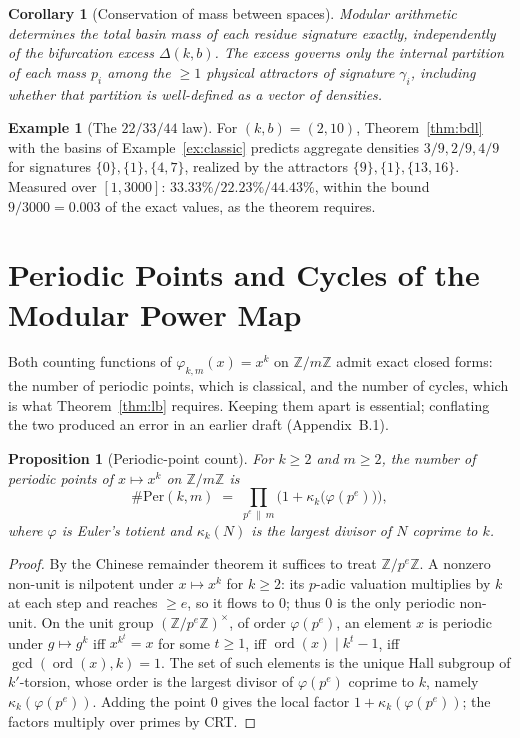 \documentclass[11pt]{article}
\newtheorem{proposition}[theorem]{Proposition}
\newtheorem{corollary}[theorem]{Corollary}
\theoremstyle{definition}
\newtheorem{example}[theorem]{Example}
\theoremstyle{remark}
\newcommand{\Per}{\mathrm{Per}}
\DeclareMathOperator{\ord}{ord}
\begin{document}
\begin{corollary}[Conservation of mass between spaces]\label{cor:conservation}
Modular arithmetic determines the total basin mass of each residue signature exactly, independently of the bifurcation excess $\Delta(k,b)$. The excess governs only the internal partition of each mass $p_i$ among the $\ge 1$ physical attractors of signature $\gamma_i$, including whether that partition is well-defined as a vector of densities.
\end{corollary}

\begin{example}[The $22/33/44$ law]\label{ex:223344}
For $(k,b) = (2,10)$, Theorem~\ref{thm:bdl} with the basins of Example~\ref{ex:classic} predicts aggregate densities $3/9, 2/9, 4/9$ for signatures $\{0\},\{1\},\{4,7\}$, realized by the attractors $\{9\},\{1\},\{13,16\}$. Measured over $[1,3000]$: $33.33\% / 22.23\% / 44.43\%$, within the bound $9/3000 = 0.003$ of the exact values, as the theorem requires.
\end{example}

\section{Periodic Points and Cycles of the Modular Power Map}\label{sec:count}

Both counting functions of $\varphi_{k,m}(x) = x^k$ on $\mathbb{Z}/m\mathbb{Z}$ admit exact closed forms: the number of periodic points, which is classical, and the number of cycles, which is what Theorem~\ref{thm:lb} requires. Keeping them apart is essential; conflating the two produced an error in an earlier draft (Appendix~B.1).

\begin{proposition}[Periodic-point count]\label{prop:per}
For $k \ge 2$ and $m \ge 2$, the number of periodic points of $x \mapsto x^k$ on $\mathbb{Z}/m\mathbb{Z}$ is
\[
\#\Per(k,m) \;=\; \prod_{p^{e} \,\|\, m} \Big( 1 + \kappa_k\big(\varphi(p^{e})\big) \Big),
\]
where $\varphi$ is Euler's totient and $\kappa_k(N)$ is the largest divisor of $N$ coprime to $k$.
\end{proposition}

\begin{proof}
By the Chinese remainder theorem it suffices to treat $\mathbb{Z}/p^e\mathbb{Z}$. A nonzero non-unit is nilpotent under $x \mapsto x^k$ for $k \ge 2$: its $p$-adic valuation multiplies by $k$ at each step and reaches $\ge e$, so it flows to $0$; thus $0$ is the only periodic non-unit. On the unit group $(\mathbb{Z}/p^e\mathbb{Z})^\times$, of order $\varphi(p^e)$, an element $x$ is periodic under $g \mapsto g^k$ iff $x^{k^t} = x$ for some $t \ge 1$, iff $\ord(x) \mid k^t - 1$, iff $\gcd(\ord(x), k) = 1$. The set of such elements is the unique Hall subgroup of $k'$-torsion, whose order is the largest divisor of $\varphi(p^e)$ coprime to $k$, namely $\kappa_k(\varphi(p^e))$. Adding the point $0$ gives the local factor $1 + \kappa_k(\varphi(p^e))$; the factors multiply over primes by CRT.
\end{proof}
\end{document}
